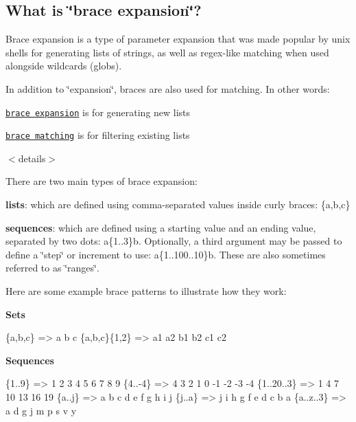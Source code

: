 \subsection*{What is \char`\"{}brace expansion\char`\"{}?}

Brace expansion is a type of parameter expansion that was made popular by unix shells for generating lists of strings, as well as regex-\/like matching when used alongside wildcards (globs).

In addition to \char`\"{}expansion\char`\"{}, braces are also used for matching. In other words\+:


\begin{DoxyItemize}
\item \href{#brace-expansion}{\tt brace expansion} is for generating new lists
\item \href{#brace-matching}{\tt brace matching} is for filtering existing lists
\end{DoxyItemize}

$<$details$>$

There are two main types of brace expansion\+:


\begin{DoxyEnumerate}
\item {\bfseries lists}\+: which are defined using comma-\/separated values inside curly braces\+: {\ttfamily \{a,b,c\}}
\item {\bfseries sequences}\+: which are defined using a starting value and an ending value, separated by two dots\+: {\ttfamily a\{1..3\}b}. Optionally, a third argument may be passed to define a \char`\"{}step\char`\"{} or increment to use\+: {\ttfamily a\{1..100..10\}b}. These are also sometimes referred to as \char`\"{}ranges\char`\"{}.
\end{DoxyEnumerate}

Here are some example brace patterns to illustrate how they work\+:

{\bfseries Sets}


\begin{DoxyCode}
\{a,b,c\}       => a b c
\{a,b,c\}\{1,2\}  => a1 a2 b1 b2 c1 c2
\end{DoxyCode}


{\bfseries Sequences}


\begin{DoxyCode}
\{1..9\}        => 1 2 3 4 5 6 7 8 9
\{4..-4\}       => 4 3 2 1 0 -1 -2 -3 -4
\{1..20..3\}    => 1 4 7 10 13 16 19
\{a..j\}        => a b c d e f g h i j
\{j..a\}        => j i h g f e d c b a
\{a..z..3\}     => a d g j m p s v y
\end{DoxyCode}


